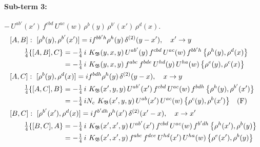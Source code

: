 \documentclass[10pt]{article}
\numberwithin{equation}{section}
\begin{document}
\paragraph{Sub-term 3:} $-\,U^{ab'}(x')\,f^{cbd}\,U^{ac}(w)\,\rho^{b}(y)\,\rho^{b'}(x')\,\rho^{d}(x)$.
\begin{align}
&[A,B]:\ [\rho^{b}(y),\rho^{b'}(x')]=i f^{bb'h}\rho^{h}(y)\,\delta^{(2)}(y-x'),\quad x'\to y\notag\\
&\qquad \tfrac14\{[A,B],C\}=-\tfrac14\,i\,\,K_{\mathfrak B}(y,x,y)\,U^{ab'}(y)\,f^{cbd}\,U^{ac}(w)\,f^{bb'h}\,\big\{\rho^{h}(y),\rho^{d}(x)\big\}\notag\\
&\qquad\phantom{\tfrac14\{[A,B],C\}}=-\tfrac14\,i\,\,K_{\mathfrak B}(y,x,y)\,f^{abc}\,f^{bde}\,U^{hd}(y)\,U^{ha}(w)\,\big\{\rho^{e}(y),\rho^{c}(x)\big\}
\label{eq:GIII.II-3-AB}\\
&[A,C]:\ [\rho^{b}(y),\rho^{d}(x)]=i f^{bdh}\rho^{h}(y)\,\delta^{(2)}(y-x),\quad x\to y\notag\\
&\qquad \tfrac14\{[A,C],B\}=-\tfrac14\,i\,\,K_{\mathfrak B}(x',y,y)\,U^{ab'}(x')\,f^{cbd}\,U^{ac}(w)\,f^{bdh}\,\big\{\rho^{h}(y),\rho^{b'}(x')\big\}\notag\\
&\qquad\phantom{\tfrac14\{[A,C],B\}}=-\tfrac14\,i N_{c}\,\,K_{\mathfrak B}(x',y,y)\,U^{ab}(x')\,U^{ac}(w)\,\big\{\rho^{c}(y),\rho^{b}(x')\big\}\quad\text{(F)}
\label{eq:GIII.II-3-AC}\\
&[B,C]:\ [\rho^{b'}(x'),\rho^{d}(x)]=i f^{b'dh}\rho^{h}(x')\,\delta^{(2)}(x'-x),\quad x\to x'\notag\\
&\qquad \tfrac14\{[B,C],A\}=-\tfrac14\,i\,\,K_{\mathfrak B}(x',x',y)\,U^{ab'}(x')\,f^{cbd}\,U^{ac}(w)\,f^{b'dh}\,\big\{\rho^{h}(x'),\rho^{b}(y)\big\}\notag\\
&\qquad\phantom{\tfrac14\{[B,C],A\}}=-\tfrac14\,i\,\,K_{\mathfrak B}(x',x',y)\,f^{abc}\,f^{dce}\,U^{hd}(x')\,U^{ha}(w)\,\big\{\rho^{e}(x'),\rho^{b}(y)\big\}
\label{eq:GIII.II-3-BC}
\end{align}
\end{document}
